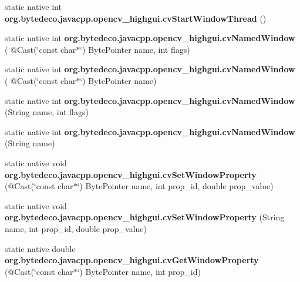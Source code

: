 \begin{DoxyCompactItemize}
\mbox{\label{group__highgui__c_gafd3a88e3bd303f7b2fe83aa0c191a346}} 
static native int {\bfseries org.\+bytedeco.\+javacpp.\+opencv\+\_\+highgui.\+cv\+Start\+Window\+Thread} ()
\item 
\mbox{\label{group__highgui__c_ga784cc390a3823cb7383408ca6a2c950f}} 
static native int {\bfseries org.\+bytedeco.\+javacpp.\+opencv\+\_\+highgui.\+cv\+Named\+Window} ( @Cast(\char`\"{}const char$\ast$\char`\"{}) Byte\+Pointer name, int flags)
\item 
\mbox{\label{group__highgui__c_gaf1afa8ccf3a613453903ab02fbe74ed8}} 
static native int {\bfseries org.\+bytedeco.\+javacpp.\+opencv\+\_\+highgui.\+cv\+Named\+Window} ( @Cast(\char`\"{}const char$\ast$\char`\"{}) Byte\+Pointer name)
\item 
\mbox{\label{group__highgui__c_ga42de644d72997d19b7a9e9c7e79e6d58}} 
static native int {\bfseries org.\+bytedeco.\+javacpp.\+opencv\+\_\+highgui.\+cv\+Named\+Window} (String name, int flags)
\item 
\mbox{\label{group__highgui__c_gac9186d5dfef4af9b40acc973fd65e1d2}} 
static native int {\bfseries org.\+bytedeco.\+javacpp.\+opencv\+\_\+highgui.\+cv\+Named\+Window} (String name)
\item 
\mbox{\label{group__highgui__c_ga353f516ee6b8c8204fa7a15a00a95836}} 
static native void {\bfseries org.\+bytedeco.\+javacpp.\+opencv\+\_\+highgui.\+cv\+Set\+Window\+Property} (@Cast(\char`\"{}const char$\ast$\char`\"{}) Byte\+Pointer name, int prop\+\_\+id, double prop\+\_\+value)
\item 
\mbox{\label{group__highgui__c_ga8e4ffc674acd2767fe6993b811831caf}} 
static native void {\bfseries org.\+bytedeco.\+javacpp.\+opencv\+\_\+highgui.\+cv\+Set\+Window\+Property} (String name, int prop\+\_\+id, double prop\+\_\+value)
\item 
\mbox{\label{group__highgui__c_gab83c544799342f18ac11240ab80d5d10}} 
static native double {\bfseries org.\+bytedeco.\+javacpp.\+opencv\+\_\+highgui.\+cv\+Get\+Window\+Property} (@Cast(\char`\"{}const char$\ast$\char`\"{}) Byte\+Pointer name, int prop\+\_\+id)

\end{DoxyCompactItemize}
